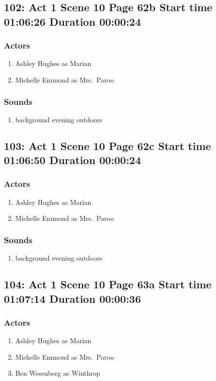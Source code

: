 \subsection{102: Act 1 Scene 10 Page 62b Start time 01:06:26 Duration 00:00:24}

\subsubsection{Actors}
\begin{enumerate}
\item Ashley Hughes as Marian
\item Michelle Emmond as Mrs.~Paroo
\end{enumerate}

\subsubsection{Sounds}
\begin{enumerate}
\item background evening outdoors
\end{enumerate}
\subsection{103: Act 1 Scene 10 Page 62c Start time 01:06:50 Duration 00:00:24}

\subsubsection{Actors}
\begin{enumerate}
\item Ashley Hughes as Marian
\item Michelle Emmond as Mrs.~Paroo
\end{enumerate}

\subsubsection{Sounds}
\begin{enumerate}
\item background evening outdoors
\end{enumerate}
\subsection{104: Act 1 Scene 10 Page 63a Start time 01:07:14 Duration 00:00:36}

\subsubsection{Actors}
\begin{enumerate}
\item Ashley Hughes as Marian
\item Michelle Emmond as Mrs.~Paroo
\item Ben Wesenberg as Winthrop
\end{enumerate}

